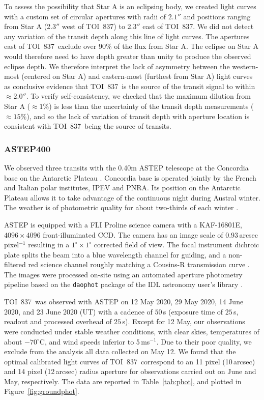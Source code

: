 \documentclass[12pt,twocolumn,tighten]{aastex63}
\newcommand{\tn}{TOI~837} %
\begin{document}
To assess the possibility that Star A is an eclipsing body, we created
light curves with a custom set of circular apertures with radii of
$2.1''$ and positions ranging from Star A (2.3$''$ west of \tn) to
2.3$''$ east of \tn.  We did not detect any variation of the transit
depth along this line of light curves. The apertures east of \tn\
exclude over 90\% of the flux from Star A.  The eclipse on Star A
would therefore need to have depth greater than unity to produce the
observed eclipse depth.  We therefore interpret the lack of asymmetry
between the western-most (centered on Star A) and eastern-most
(furthest from Star A) light curves as conclusive evidence that \tn\
is the source of the transit signal to within $\approx2.0''$.  To
verify self-consistency, we checked that the maximum dilution from
Star A ($\approx 1\%$) is less than the uncertainty of the transit
depth measurements ($\approx 15\%$), and so the lack of variation of
transit depth with aperture location is consistent with \tn\ being the
source of transits.



\subsubsection{ASTEP400}

We observed three transits with the 0.40m ASTEP telescope at the
Concordia base on the Antarctic Plateau \citep{daban_astep_2010}.
Concordia base is operated jointly by the French and Italian polar
institutes, IPEV and PNRA.  Its position on the Antarctic Plateau
allows it to take advantage of
the continuous night during Austral winter.  The weather is of
photometric quality for about two-thirds of each winter
\citep{crouzet_four_2018}.

ASTEP is equipped with a FLI Proline science camera with a KAF-16801E,
$4096\times4096$ front-illuminated CCD. The camera has an image scale
of 0.93\,arcsec pixel$^{-1}$ resulting in a $1^{\circ}\times1^{\circ}$
corrected field of view. The focal instrument dichroic plate splits
the beam into a blue wavelength channel for guiding, and a
non-filtered red science channel roughly matching a Cousins-R
transmission curve
\citep{abe_secondary_2013,mekarnia_transiting_2016}.  The images were
processed on-site using an automated aperture  photometry pipeline
based on the \texttt{daophot} package of the IDL astronomy user's
library \citep{landsman_1995}.

\tn\ was observed with ASTEP on 12 May 2020, 29 May 2020, 14 June
2020, and 23 June 2020 (UT) with a cadence of $50\,$s (exposure time
of $25\,$s, readout and processed overhead of $25\,$s).  Except for 12
May, our observations were conducted under stable weather conditions,
with clear skies, temperatures of about $-70^\circ$C, and wind speeds
inferior to 5\,ms$^{-1}$. Due to their poor quality, we exclude from
the analysis all data collected on May 12. We found that the optimal
calibrated light curves of \tn\ correspond to an 11 pixel (10\,arcsec)
and 14 pixel (12\,arcsec) radius aperture for observations carried out
on June and May, respectively.  The data are reported in
Table~\ref{tab:phot}, and plotted in Figure~\ref{fig:groundphot}.
\end{document}
